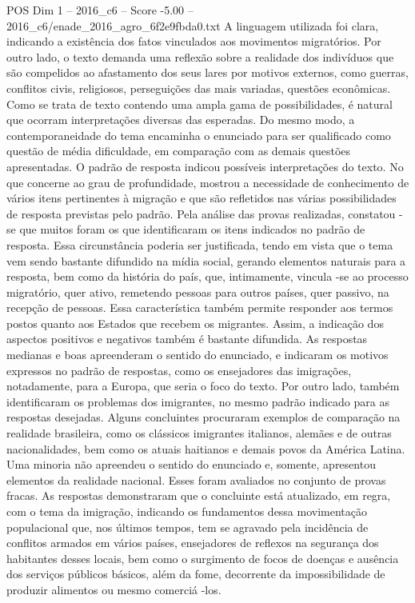\begin{textsample}{POS Dim 1 – 2016\_c6 – Score -5.00 – 2016\_c6/enade\_2016\_agro\_6f2e9fbda0.txt}
A linguagem utilizada foi clara, indicando a existência dos fatos vinculados aos movimentos migratórios.
Por outro lado, o texto demanda uma reflexão sobre a realidade dos indivíduos que são compelidos ao afastamento dos seus lares por motivos externos, como guerras, conflitos civis, religiosos, perseguições das mais variadas, questões econômicas.
Como se trata de texto contendo uma ampla gama de possibilidades, é natural que ocorram interpretações diversas das esperadas.
Do mesmo modo, a contemporaneidade do tema encaminha o enunciado para ser qualificado como questão de média dificuldade, em comparação com as demais questões apresentadas.
O padrão de resposta indicou possíveis interpretações do texto.
No que concerne ao grau de profundidade, mostrou a necessidade de conhecimento de vários itens pertinentes à migração e que são refletidos nas várias possibilidades de resposta previstas pelo padrão.
Pela análise das provas realizadas, constatou -se que muitos foram os que identificaram os itens indicados no padrão de resposta.
Essa circunstância poderia ser justificada, tendo em vista que o tema vem sendo bastante difundido na mídia social, gerando elementos naturais para a resposta, bem como da história do país, que, intimamente, vincula -se ao processo migratório, quer ativo, remetendo pessoas para outros países, quer passivo, na recepção de pessoas.
Essa característica também permite responder aos termos postos quanto aos Estados que recebem os migrantes.
Assim, a indicação dos aspectos positivos e negativos também é bastante difundida.
As respostas medianas e boas apreenderam o sentido do enunciado, e indicaram os motivos expressos no padrão de respostas, como os ensejadores das imigrações, notadamente, para a Europa, que seria o foco do texto.
Por outro lado, também identificaram os problemas dos imigrantes, no mesmo padrão indicado para as respostas desejadas.
Alguns concluintes procuraram exemplos de comparação na realidade brasileira, como os clássicos imigrantes italianos, alemães e de outras nacionalidades, bem como os atuais haitianos e demais povos da América Latina.
Uma minoria não apreendeu o sentido do enunciado e, somente, apresentou elementos da realidade nacional.
Esses foram avaliados no conjunto de provas fracas.
As respostas demonstraram que o concluinte está atualizado, em regra, com o tema da imigração, indicando os fundamentos dessa movimentação populacional que, nos últimos tempos, tem se agravado pela incidência de conflitos armados em vários países, ensejadores de reflexos na segurança dos habitantes desses locais, bem como o surgimento de focos de doenças e ausência dos serviços públicos básicos, além da fome, decorrente da impossibilidade de produzir alimentos ou mesmo comerciá -los.

\end{textsample}
